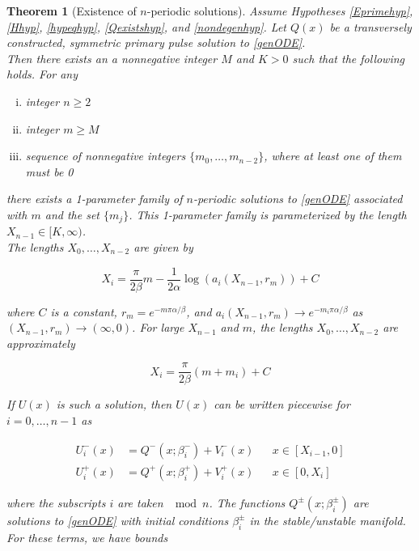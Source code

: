 \documentclass[12pt]{article}
\newtheorem{theorem}{Theorem}
\begin{document}
\begin{theorem}[Existence of $n$-periodic solutions]\label{perexist}
Assume Hypotheses \ref{Eprimehyp}, \ref{Hhyp}, \ref{hypeqhyp}, \ref{Qexistshyp}, and \ref{nondegenhyp}. Let $Q(x)$ be a transversely constructed, symmetric primary pulse solution to \eqref{genODE}.\\

Then there exists an a nonnegative integer $M$ and $K > 0$ such that the following holds. For any 
\begin{enumerate}[(i)]
\item integer $n \geq 2$ \\
\item integer $m \geq M$ \\
\item sequence of nonnegative integers $\{ m_0, \dots, m_{n-2} \}$, where at least one of them must be 0
\end{enumerate}

there exists a 1-parameter family of $n$-periodic solutions to \eqref{genODE} associated with $m$ and the set $\{ m_j \}$. This 1-parameter family is parameterized by the length $X_{n-1} \in [K, \infty)$.\\

The lengths $X_0, \dots, X_{n-2}$ are given by

\begin{equation}\label{Xi}
X_i = \frac{\pi}{2 \beta}m 
- \frac{1}{2 \alpha} \log(a_i(X_{n-1}, r_m)) + C
\end{equation}

where $C$ is a constant, $r_m = e^{-m \pi \alpha/\beta}$, and $a_i(X_{n-1}, r_m) \rightarrow e^{-m_i \pi \alpha/ \beta}$ as $(X_{n-1}, r_m) \rightarrow (\infty, 0)$. For large $X_{n-1}$ and $m$, the lengths $X_0, \dots, X_{n-2}$ are approximately

\begin{equation}\label{Xiapprox}
X_i = \frac{\pi}{2 \beta}(m + m_i) + C
\end{equation}

If $U(x)$ is such a solution, then $U(x)$ can be written piecewise for $i = 0, \dots, n-1$ as 

\begin{align}
U_i^-(x) &= Q^-(x; \beta_i^-) + V_i^-(x) && x \in [X_{i-1}, 0] \\
U_i^+(x) &= Q^+(x; \beta_i^+) + V_i^+(x) && x \in [0, X_i]
\end{align}

where the subscripts $i$ are taken $\mod n$. The functions $Q^\pm(x; \beta_i^\pm)$ are solutions to \eqref{genODE} with initial conditions $\beta_i^\pm$ in the stable/unstable manifold. For these terms, we have bounds


\end{theorem}
\end{document}
